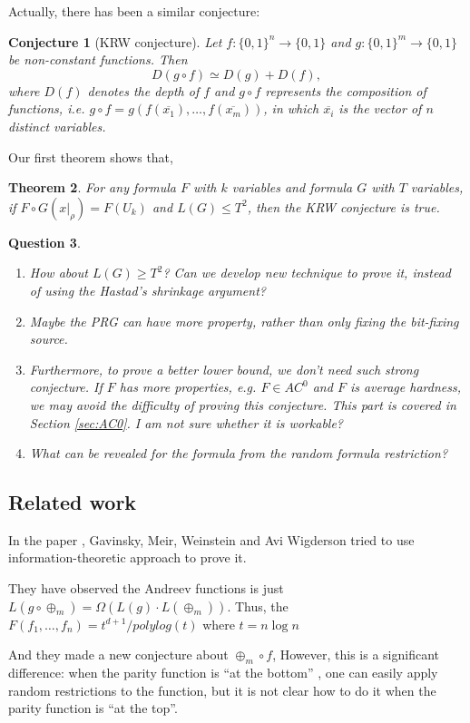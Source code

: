 \documentclass[12pt]{article}
\newtheorem{theorem}{Theorem}[section]
\newtheorem{q}[theorem]{Question}
\newtheorem{conjecture}[theorem]{Conjecture}
\renewcommand{\.}{,\ldots,}
\begin{document}
Actually, there has been a similar conjecture: 
\begin{conjecture}[KRW conjecture]
Let $f : \{0, 1\}^n\rightarrow \{0, 1\}$ and $g : \{0, 1\}^m \rightarrow \{0, 1\}$ be non-constant functions. Then
$$D(g \circ f) \simeq D(g) + D(f),$$
where $D(f)$ denotes the depth of $f$ and $g\circ f$ represents the composition of functions, i.e. $g\circ f=g(f(\overline{x_1}),\ldots, f(\overline{x_m}))$, in which $\overline{x_i}$ is the vector of $n$ distinct variables. 
\end{conjecture}

Our first theorem shows that, 
\begin{theorem}
	For any formula $F$ with $k$ variables and  formula $G$ with $T$ variables, if $F\circ G(x|_\rho)=F(U_k)$ and $L(G)\leq T^2$, then the KRW conjecture is true.
\end{theorem}
\begin{q}
	\begin{enumerate}
		\item How about $L(G)\ge T^2$?  Can we develop new technique to prove it, instead of using the Hastad's shrinkage argument?
		\item Maybe the PRG  can have more property, rather than only fixing the bit-fixing source.
		\item Furthermore, to prove a better lower bound, we don't need such strong conjecture. If $F$ has more properties, e.g. $F\in AC^0$ and $F$ is average hardness, we may avoid the difficulty of proving this conjecture. This part is covered in Section \ref{sec:AC0}. I am not sure whether it is  workable? 
		\item What can be revealed for the formula from the random formula restriction?
		\end{enumerate}
		\end{q}
\subsection{Related work}
In the paper \cite{gavinsky2014toward},  Gavinsky, Meir, Weinstein and Avi Wigderson tried to use information-theoretic approach to prove it.  

They have observed the Andreev functions is just 
$L(g \circ \oplus_m) = \Omega( L(g) \cdot L(\oplus_m)).$
Thus, the $F(f_1\.f_n)=t^{d+1}/polylog (t)$ where $t=n\log n$

And they made a new conjecture about $\oplus_m\circ f$, However, this is a significant difference:
when the parity function is “at the bottom” , one can easily apply random restrictions
to the function, but it is not clear how to do it when the parity function is “at the top”.
\end{document}
